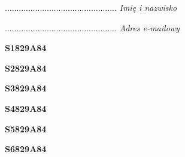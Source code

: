\begin{turn}{90}\begin{minipage}{\linewidth} \vspace{20mm} ................................................  \textit{Imię i nazwisko}\end{minipage}\end{turn}

\begin{turn}{90}\begin{minipage}{\linewidth} \vspace{20mm} ................................................  \textit{Adres e-mailowy}\end{minipage}\end{turn}

\begin{turn}{90}\huge \begin{minipage}{\linewidth} \vspace{10mm}\textbf{S1829A84}\end{minipage}\end{turn}

\begin{turn}{90}\huge \begin{minipage}{\linewidth} \vspace{10mm}\textbf{S2829A84}\end{minipage}\end{turn}

\begin{turn}{90}\huge \begin{minipage}{\linewidth} \vspace{10mm}\textbf{S3829A84}\end{minipage}\end{turn}

\begin{turn}{90}\huge \begin{minipage}{\linewidth} \vspace{10mm}\textbf{S4829A84}\end{minipage}\end{turn}

\begin{turn}{90}\huge \begin{minipage}{\linewidth} \vspace{10mm}\textbf{S5829A84}\end{minipage}\end{turn}

\begin{turn}{90}\huge \begin{minipage}{\linewidth} \vspace{10mm}\textbf{S6829A84}\end{minipage}\end{turn}

